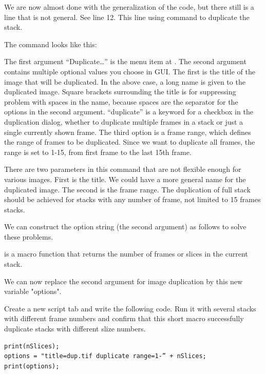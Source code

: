 We are now almost done with the generalization of the code, but there still is a line that is not general. See line 12. This line using  command to duplicate the stack.

The command looks like this:


The first argument ``Duplicate\ldots'' is the menu item at . The second argument contains multiple optional values you choose in GUI. The first is the title of the image that will be duplicated. In the above case, a long name is given to the duplicated image. Square brackets surrounding the title is for suppressing problem with spaces in the name, because spaces are the separator for the options in the second argument. ``duplicate'' is a keyword for a checkbox in the duplication dialog, whether to duplicate multiple frames in a stack or just a single currently shown frame. The third option is a frame range, which defines the range of frames to be duplicated. Since we want to duplicate all frames, the range is set to 1-15, from first frame to the last 15th frame.

There are two parameters in this command that are not flexible enough for various images. First is the title. We could have a more general name for the duplicated image. The second is the frame range.  The duplication of full stack should be achieved for stacks with any number of frame, not limited to 15 frames stacks. 

We can construct the option string (the second argument) as follows to solve these problems. 


 is a macro function that returns the number of frames or slices in the current stack. 

We can now replace the second argument for image duplication by this new variable "options". 


\begin{indentexercise}{2}
Create a new script tab and write the following code. Run it with several stacks with different frame numbers and confirm that this short macro successfully duplicate stacks with different slize numbers. 
\begin{lstlisting}
print(nSlices);
options = "title=dup.tif duplicate range=1-” + nSlices;
print(options);
\end{lstlisting}
\end{indentexercise}

